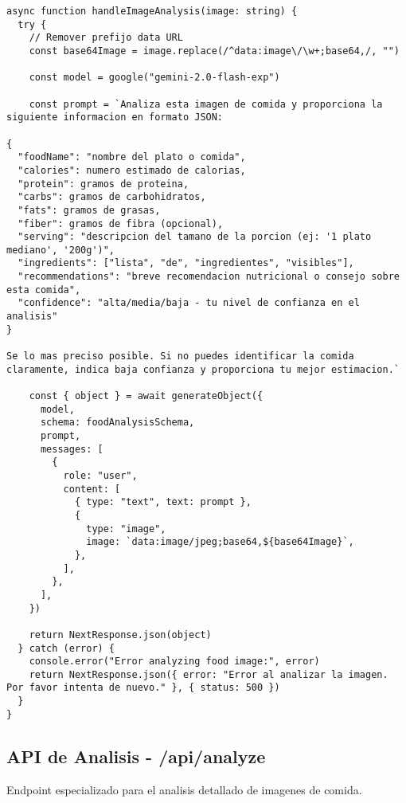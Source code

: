 \documentclass[12pt,a4paper]{article}
\begin{document}
\begin{lstlisting}[caption=Funcion handleImageAnalysis - Analisis con IA]
async function handleImageAnalysis(image: string) {
  try {
    // Remover prefijo data URL
    const base64Image = image.replace(/^data:image\/\w+;base64,/, "")

    const model = google("gemini-2.0-flash-exp")

    const prompt = `Analiza esta imagen de comida y proporciona la siguiente informacion en formato JSON:

{
  "foodName": "nombre del plato o comida",
  "calories": numero estimado de calorias,
  "protein": gramos de proteina,
  "carbs": gramos de carbohidratos,
  "fats": gramos de grasas,
  "fiber": gramos de fibra (opcional),
  "serving": "descripcion del tamano de la porcion (ej: '1 plato mediano', '200g')",
  "ingredients": ["lista", "de", "ingredientes", "visibles"],
  "recommendations": "breve recomendacion nutricional o consejo sobre esta comida",
  "confidence": "alta/media/baja - tu nivel de confianza en el analisis"
}

Se lo mas preciso posible. Si no puedes identificar la comida claramente, indica baja confianza y proporciona tu mejor estimacion.`

    const { object } = await generateObject({
      model,
      schema: foodAnalysisSchema,
      prompt,
      messages: [
        {
          role: "user",
          content: [
            { type: "text", text: prompt },
            {
              type: "image",
              image: `data:image/jpeg;base64,${base64Image}`,
            },
          ],
        },
      ],
    })

    return NextResponse.json(object)
  } catch (error) {
    console.error("Error analyzing food image:", error)
    return NextResponse.json({ error: "Error al analizar la imagen. Por favor intenta de nuevo." }, { status: 500 })
  }
}
\end{lstlisting}

\subsection{API de Analisis - /api/analyze}

Endpoint especializado para el analisis detallado de imagenes de comida.
\end{document}
